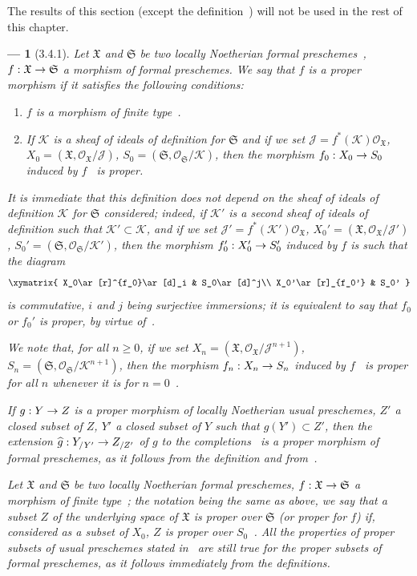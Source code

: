 \documentclass[oneside]{amsart}
\theoremstyle{ega-env-style}
\newtheorem*{env}{---}
\theoremstyle{ega-thm-env-style}
\theoremstyle{ega-defn-env-style}
\def\mathcal{\mathscr}
\def\sh{\mathcal}                   %
\def\geq{\geqslant}                 %
\renewcommand{\to}{\mathchoice{\longrightarrow}{\rightarrow}{\rightarrow}{\rightarrow}}
\newcommand{\oldpage}[2][]{{\marginnote{\normalfont{\textbf{#1}~|~#2}}}\ignorespaces}
\let\EGAOriginalLabel\label
\renewcommand{\label}[1]{\phantomsection\EGAOriginalLabel{#1}}
\begin{document}
\oldpage[III]{119}
The results of this section (except the definition~) will not be used in the rest of this chapter.

\begin{env}[3.4.1]
\label{III.3.4.1}
Let $\mathfrak{X}$ and $\mathfrak{S}$ be two locally Noetherian formal preschemes~, $f:\mathfrak{X}\to\mathfrak{S}$ a morphism of formal preschemes.
We say that $f$ is a \emph{proper} morphism if it satisfies the following conditions:
\begin{enumerate}
  \item[1st.] \emph{$f$ is a morphism of finite type~}.
  \item[2nd.] \emph{If $\sh{K}$ is a sheaf of ideals of definition for $\mathfrak{S}$ and if we set $\sh{J}=f^*(\sh{K})\sh{O}_\mathfrak{X}$, $X_0=(\mathfrak{X},\sh{O}_\mathfrak{X}/\sh{J})$, $S_0=(\mathfrak{S},\sh{O}_\mathfrak{S}/\sh{K})$, then the morphism $f_0:X_0\to S_0$ induced by $f$~ is proper}.
\end{enumerate}
It is immediate that this definition does not depend on the sheaf of ideals of definition $\sh{K}$ for $\mathfrak{S}$ considered; indeed, if $\sh{K}'$ is a second sheaf of ideals of definition such that $\sh{K}'\subset\sh{K}$, and if we set $\sh{J}'=f^*(\sh{K}')\sh{O}_\mathfrak{X}$, $X_0'=(\mathfrak{X},\sh{O}_\mathfrak{X}/\sh{J}')$, $S_0'=(\mathfrak{S},\sh{O}_\mathfrak{S}/\sh{K}')$, then the morphism $f_0':X_0'\to S_0'$ induced by $f$ is such that the diagram
\[
  \xymatrix{
    X_0\ar[r]^{f_0}\ar[d]_i &
    S_0\ar[d]^j\\
    X_0'\ar[r]_{f_0'} &
    S_0'
  }
\]
is commutative, $i$ and $j$ being surjective immersions; it is equivalent to say that $f_0$ or $f_0'$ is proper, by virtue of~.

We note that, for all $n\geq 0$, if we set $X_n=(\mathfrak{X},\sh{O}_\mathfrak{X}/\sh{J}^{n+1})$, $S_n=(\mathfrak{S},\sh{O}_\mathfrak{S}/\sh{K}^{n+1})$, then the morphism $f_n:X_n\to S_n$ induced by $f$~ is proper for all $n$ whenever it is for $n=0$~.

If $g:Y\to Z$ is a proper morphism of locally Noetherian usual preschemes, $Z'$ a closed subset of $Z$, $Y'$ a closed subset of $Y$ such that $g(Y')\subset Z'$, then the extension $\widehat{g}:Y_{/Y'}\to Z_{/Z'}$ of $g$ to the completions~ is a proper morphism of formal preschemes, as it follows from the definition and from~.

Let $\mathfrak{X}$ and $\mathfrak{S}$ be two locally Noetherian formal preschemes, $f:\mathfrak{X}\to\mathfrak{S}$ a morphism \emph{of finite type}~; the notation being the same as above, we say that a subset $Z$ of the underlying space of $\mathfrak{X}$ is \emph{proper} over $\mathfrak{S}$ (or proper for $f$) if, considered as a subset of $X_0$, $Z$ is \emph{proper over $S_0$}~.
All the properties of proper subsets of usual preschemes stated in~ are still true for the proper subsets of formal preschemes, as it follows immediately from the definitions.
\end{env}
\end{document}
